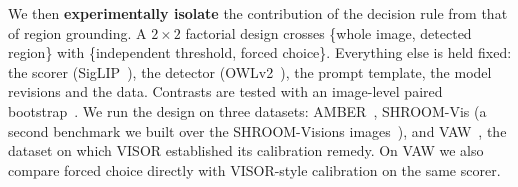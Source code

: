 \documentclass[11pt]{article}
\begin{document}
We then \textbf{experimentally isolate} the contribution of the decision rule from that of region grounding. A $2\times2$ factorial design crosses \{whole image, detected region\} with \{independent threshold, forced choice\}. Everything else is held fixed: the scorer (SigLIP~\cite{zhai2023siglip}), the detector (OWLv2~\cite{minderer2023owlv2}), the prompt template, the model revisions and the data. Contrasts are tested with an image-level paired bootstrap~\cite{efron1979bootstrap,field2007clustered}. We run the design on three datasets: AMBER~\cite{wang2023amber}, SHROOM-Vis (a second benchmark we built over the SHROOM-Visions images~\cite{vazquez2026shroomvisions}), and VAW~\cite{pham2021vaw}, the dataset on which VISOR established its calibration remedy. On VAW we also compare forced choice directly with VISOR-style calibration on the same scorer.
\end{document}
